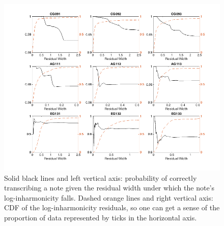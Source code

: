 \documentclass[12pt]{cmuthesis}
\begin{document}
\begin{figure}[!htbp] 
\label{fig:p-correct-res}
\centering
\includegraphics[angle=90,scale=0.65]{p-correct-res}
\caption{Solid black lines and left vertical axis: probability of correctly transcribing a note given the residual width under which the note's log-inharmonicity falls. Dashed orange lines and right vertical axis: CDF of the log-inharmonicity residuals, so one can get a sense of the proportion of data represented by ticks in the horizontal axis.}
\end{figure} 


\end{document}
